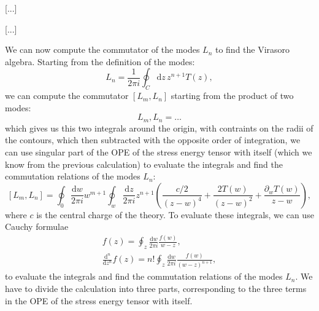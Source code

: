 [...]

[...]


We can now compute the commutator of the modes \(L_n\) to find the Virasoro algebra. Starting from the definition of the modes:
\[
    L_n = \frac{1}{2\pi i} \oint_C \mathrm{d} z \, z^{n+1} T(z),
\]
we can compute the commutator \([L_m, L_n]\) starting from the product of two modes:
\[
    L_m, L_n = \dots
\]
which gives us this two integrals around the origin, with contraints on the radii of the contours, which then subtracted with the opposite order of integration, we can use singular part of the OPE of the stress energy tensor with itself (which we know from the previous calculation) to evaluate the integrals and find the commutation relations of the modes \(L_n\):
\[
    [L_m, L_n] = \oint_{0} \frac{\mathrm{d} w}{2\pi i} w^{m+1} \oint_{w} \frac{\mathrm{d} z}{2\pi i} z^{n+1} \left( \frac{c / 2}{(z-w)^4} + \frac{2 T(w)}{(z-w)^2} + \frac{\partial_w T(w)}{z-w} \right),
\]
where \(c\) is the central charge of the theory. To evaluate these integrals, we can use Cauchy formulae
\[
    \begin{aligned}
        f(z) = \oint_{z} \frac{\mathrm{d} w}{2 \pi i} \frac{f(w)}{w-z}, \\
        \frac{\mathrm{d}^n}{\mathrm{d} z^n} f(z) = n! \oint_{z} \frac{\mathrm{d} w}{2 \pi i} \frac{f(w)}{(w-z)^{n+1}},
    \end{aligned}
\]
to evaluate the integrals and find the commutation relations of the modes \(L_n\). We have to divide the calculation into three parts, corresponding to the three terms in the OPE of the stress energy tensor with itself.

